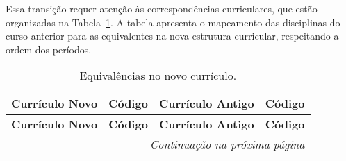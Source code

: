 Essa transição requer atenção às correspondências curriculares, que estão organizadas na Tabela~\ref{tab:desc-equi-long}. A tabela apresenta o mapeamento das disciplinas do curso anterior para as equivalentes na nova estrutura curricular, respeitando a ordem dos períodos.

\renewcommand{\arraystretch}{1.5}
\begin{small}
    \begin{longtable}{p{5.8cm}l|p{6.2cm}l}
        \caption{Equivalências no novo currículo.}
        \label{tab:desc-equi-long}                                                                                                                      \\
        \hline
        \rowcolor{gray!20}
        \textbf{Currículo Novo} & \textbf{Código}   & \textbf{Currículo Antigo}                                          & \textbf{Código}              \\
        \hline
        \endfirsthead

        \hline
        \rowcolor{gray!20}
        \textbf{Currículo Novo} & \textbf{Código}   & \textbf{Currículo Antigo}                                          & \textbf{Código}              \\
        \hline
        \endhead

        \multicolumn{4}{r}{\small\itshape Continuação na próxima página}
        \endfoot


\end{longtable}
\end{small}
